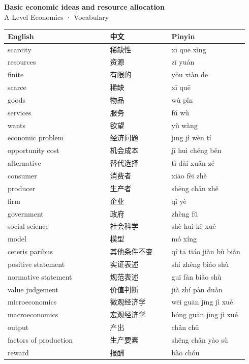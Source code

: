 \documentclass[11pt]{article}
\begin{document}
\begin{center}
  {\LARGE\bfseries Basic economic ideas and resource allocation}\\[0.35em]
  {\large A Level Economics · Vocabulary}
\end{center}
\vspace{0.6em}

\begin{longtable}{@{}p{0.40\linewidth}p{0.24\linewidth}p{0.30\linewidth}@{}}
\toprule
\textbf{English} & \textbf{中文} & \textbf{Pinyin} \\
\midrule
\endhead
\bottomrule
\endlastfoot
scarcity & 稀缺性 & xī quē xìng \\
resources & 资源 & zī yuán \\
finite & 有限的 & yǒu xiàn de \\
scarce & 稀缺 & xī quē \\
goods & 物品 & wù pǐn \\
services & 服务 & fú wù \\
wants & 欲望 & yù wàng \\
economic problem & 经济问题 & jīng jì wèn tí \\
opportunity cost & 机会成本 & jī huì chéng běn \\
alternative & 替代选择 & tì dài xuǎn zé \\
consumer & 消费者 & xiāo fèi zhě \\
producer & 生产者 & shēng chǎn zhě \\
firm & 企业 & qǐ yè \\
government & 政府 & zhèng fǔ \\
social science & 社会科学 & shè huì kē xué \\
model & 模型 & mó xíng \\
ceteris paribus & 其他条件不变 & qí tā tiáo jiàn bù biàn \\
positive statement & 实证表述 & shí zhèng biǎo shù \\
normative statement & 规范表述 & guī fàn biǎo shù \\
value judgement & 价值判断 & jià zhí pàn duàn \\
microeconomics & 微观经济学 & wēi guān jīng jì xué \\
macroeconomics & 宏观经济学 & hóng guān jīng jì xué \\
output & 产出 & chǎn chū \\
factors of production & 生产要素 & shēng chǎn yào sù \\
reward & 报酬 & bào chóu \\

\end{longtable}
\end{document}
